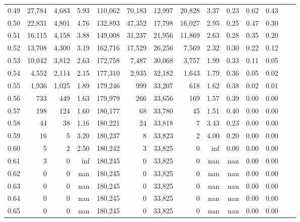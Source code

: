 \begin{tabular}{rrrrrrrrrrrrrr}
0.49 &  27,784 &  4,683 &    5.93 &  110,062 &   70,183 &  12,997 &  20,828 &  3.37 &  0.23 &  0.62 &      0.43 \\
0.50 &  22,831 &  4,801 &    4.76 &  132,893 &   47,352 &  17,798 &  16,027 &  2.95 &  0.25 &  0.47 &      0.30 \\
0.51 &  16,115 &  4,158 &    3.88 &  149,008 &   31,237 &  21,956 &  11,869 &  2.63 &  0.28 &  0.35 &      0.20 \\
0.52 &  13,708 &  4,300 &    3.19 &  162,716 &   17,529 &  26,256 &   7,569 &  2.32 &  0.30 &  0.22 &      0.12 \\
0.53 &  10,042 &  3,812 &    2.63 &  172,758 &    7,487 &  30,068 &   3,757 &  1.99 &  0.33 &  0.11 &      0.05 \\
0.54 &   4,552 &  2,114 &    2.15 &  177,310 &    2,935 &  32,182 &   1,643 &  1.79 &  0.36 &  0.05 &      0.02 \\
0.55 &   1,936 &  1,025 &    1.89 &  179,246 &      999 &  33,207 &     618 &  1.62 &  0.38 &  0.02 &      0.01 \\
0.56 &     733 &    449 &    1.63 &  179,979 &      266 &  33,656 &     169 &  1.57 &  0.39 &  0.00 &      0.00 \\
0.57 &     198 &    124 &    1.60 &  180,177 &       68 &  33,780 &      45 &  1.51 &  0.40 &  0.00 &      0.00 \\
0.58 &      44 &     38 &    1.16 &  180,221 &       24 &  33,818 &       7 &  3.43 &  0.23 &  0.00 &      0.00 \\
0.59 &      16 &      5 &    3.20 &  180,237 &        8 &  33,823 &       2 &  4.00 &  0.20 &  0.00 &      0.00 \\
0.60 &       5 &      2 &    2.50 &  180,242 &        3 &  33,825 &       0 &   inf &  0.00 &  0.00 &      0.00 \\
0.61 &       3 &      0 &     inf &  180,245 &        0 &  33,825 &       0 &   nan &   nan &  0.00 &      0.00 \\
0.62 &       0 &      0 &     nan &  180,245 &        0 &  33,825 &       0 &   nan &   nan &  0.00 &      0.00 \\
0.63 &       0 &      0 &     nan &  180,245 &        0 &  33,825 &       0 &   nan &   nan &  0.00 &      0.00 \\
0.64 &       0 &      0 &     nan &  180,245 &        0 &  33,825 &       0 &   nan &   nan &  0.00 &      0.00 \\
0.65 &       0 &      0 &     nan &  180,245 &        0 &  33,825 &       0 &   nan &   nan &  0.00 &      0.00 \\

\end{tabular}
